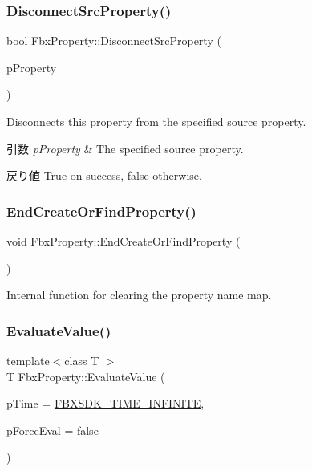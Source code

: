 \subsubsection{\texorpdfstring{Disconnect\+Src\+Property()}{DisconnectSrcProperty()}}
{\footnotesize\ttfamily bool Fbx\+Property\+::\+Disconnect\+Src\+Property (\begin{DoxyParamCaption}\item[{const \hyperlink{class_fbx_property}{Fbx\+Property} \&}]{p\+Property }\end{DoxyParamCaption})}

Disconnects this property from the specified source property. 
\begin{DoxyParams}{引数}
{\em p\+Property} & The specified source property. \\
\hline
\end{DoxyParams}
\begin{DoxyReturn}{戻り値}
{\ttfamily True} on success, {\ttfamily false} otherwise. 
\end{DoxyReturn}
\mbox{\label{class_fbx_property_a1af85e75268d31cb28323895ad45d52c}} 
\subsubsection{\texorpdfstring{End\+Create\+Or\+Find\+Property()}{EndCreateOrFindProperty()}}
{\footnotesize\ttfamily void Fbx\+Property\+::\+End\+Create\+Or\+Find\+Property (\begin{DoxyParamCaption}{ }\end{DoxyParamCaption})}



Internal function for clearing the property name map. 

\mbox{\label{class_fbx_property_a6256ee462711d9b236f345a4c7eb8a75}} 
\subsubsection{\texorpdfstring{Evaluate\+Value()}{EvaluateValue()}\hspace{0.1cm}{\footnotesize\ttfamily [1/2]}}
{\footnotesize\ttfamily template$<$class T $>$ \\
T Fbx\+Property\+::\+Evaluate\+Value (\begin{DoxyParamCaption}\item[{const \hyperlink{class_fbx_time}{Fbx\+Time} \&}]{p\+Time = {\ttfamily \hyperlink{fbxtime_8h_a1e6db3fe0f84f0b7daa775739f93526f}{F\+B\+X\+S\+D\+K\+\_\+\+T\+I\+M\+E\+\_\+\+I\+N\+F\+I\+N\+I\+TE}},  }\item[{bool}]{p\+Force\+Eval = {\ttfamily false} }\end{DoxyParamCaption})}

